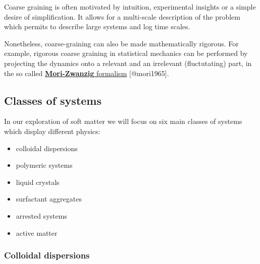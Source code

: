 \documentclass[
  letterpaper,
  enabledeprecatedfontcommands]{report}
\providecommand{\tightlist}{%
  \setlength{\itemsep}{0pt}\setlength{\parskip}{0pt}}
\begin{document}
\begin{tcolorbox}[enhanced jigsaw, leftrule=.75mm, bottomrule=.15mm, toprule=.15mm, colbacktitle=quarto-callout-note-color!10!white, title=\textcolor{quarto-callout-note-color}{\faInfo}\hspace{0.5em}{Coarse graining}, breakable, titlerule=0mm, opacitybacktitle=0.6, colback=white, coltitle=black, colframe=quarto-callout-note-color-frame, bottomtitle=1mm, rightrule=.15mm, toptitle=1mm, left=2mm, opacityback=0, arc=.35mm]

Coarse graining is often motivated by intuition, experimental insights
or a simple desire of simplification. It allows for a multi-scale
description of the problem which permits to describe large systems and
log time scales.

Nonetheless, coarse-graining can also be made mathematically rigorous.
For example, rigorous coarse graining in statistical mechanics can be
performed by projecting the dynamics onto a relevant and an irrelevant
(fluctutating) part, in the so called
\href{https://en.wikipedia.org/wiki/Mori-Zwanzig_formalism}{\textbf{Mori-Zwanzig}
formalism} {[}@mori1965{]}.

\end{tcolorbox}

\subsection{Classes of systems}\label{classes-of-systems}

In our exploration of soft matter we will focus on six main classes of
systems which display different physics:

\begin{itemize}
\tightlist
\item
  colloidal dispersions
\item
  polymeric systems
\item
  liquid crystals
\item
  surfactant aggregates
\item
  arrested systems
\item
  active matter
\end{itemize}

\subsubsection*{Colloidal dispersions}\label{colloidal-dispersions}
\end{document}
